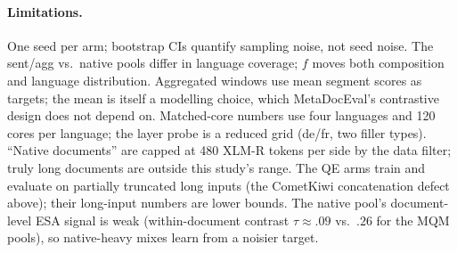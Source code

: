 \documentclass[11pt]{article}
\begin{document}
\paragraph{Limitations.}
One seed per arm; bootstrap CIs quantify sampling noise, not seed noise.
The sent/agg vs.\ native pools differ in language coverage; $f$ moves both composition and language distribution.
Aggregated windows use mean segment scores as targets; the mean is itself a modelling choice, which MetaDocEval's contrastive design does not depend on.
Matched-core numbers use four languages and 120 cores per language; the layer probe is a reduced grid (de/fr, two filler types).
``Native documents'' are capped at 480 XLM-R tokens per side by the data filter; truly long documents are outside this study's range.
The QE arms train and evaluate on partially truncated long inputs (the CometKiwi concatenation defect above); their long-input numbers are lower bounds.
The native pool's document-level ESA signal is weak (within-document contrast $\tau \approx .09$ vs.\ $.26$ for the MQM pools), so native-heavy mixes learn from a noisier target.



\end{document}
